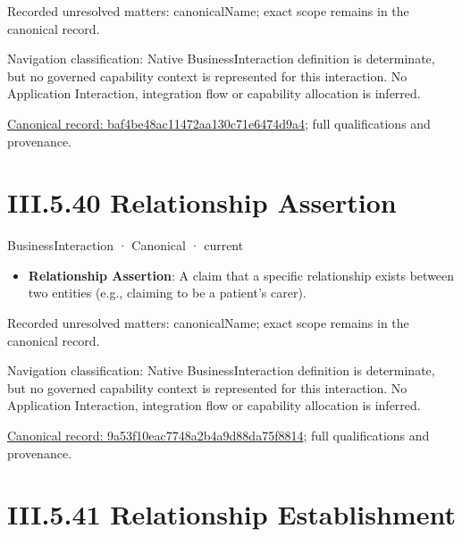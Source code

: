 {\small Recorded unresolved matters: canonicalName; exact scope remains in the canonical record.}\par
{\small Navigation classification: Native BusinessInteraction definition is determinate, but no governed capability context is represented for this interaction. No Application Interaction, integration flow or capability allocation is inferred.}\par
{\footnotesize \href{../../../../continuum/business/business-interaction/baf4be48ac11472aa130c71e6474d9a4.md}{Canonical record: baf4be48ac11472aa130c71e6474d9a4}; full qualifications and provenance.}\par
\section*{III.5.40 Relationship Assertion}
\label{navigation:III.5.40}

\label{element:9a53f10eac7748a2b4a9d88da75f8814}
{\small BusinessInteraction · Canonical · current}\par

\begin{itemize}


\item \textbf{Relationship Assertion}: A claim that a specific relationship exists between two entities (e.g., claiming to be a patient's carer).

\end{itemize}

{\small Recorded unresolved matters: canonicalName; exact scope remains in the canonical record.}\par
{\small Navigation classification: Native BusinessInteraction definition is determinate, but no governed capability context is represented for this interaction. No Application Interaction, integration flow or capability allocation is inferred.}\par
{\footnotesize \href{../../../../continuum/business/business-interaction/9a53f10eac7748a2b4a9d88da75f8814.md}{Canonical record: 9a53f10eac7748a2b4a9d88da75f8814}; full qualifications and provenance.}\par
\section*{III.5.41 Relationship Establishment}
\label{navigation:III.5.41}

